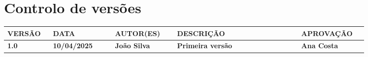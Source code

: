 \setlength{\headheight}{61.22015pt}
\addtolength{\topmargin}{-11.22015pt}

\newpage
\thispagestyle{otherpages}
\vspace*{30pt}
\section*{Controlo de versões}

\small
\begin{tabular}{| >{\centering\arraybackslash}p{0.1\linewidth} | >{\centering\arraybackslash}p{0.15\linewidth} | >{\centering\arraybackslash}p{0.15\linewidth} | >{\centering\arraybackslash}p{0.3\linewidth} | >{\centering\arraybackslash}p{0.15\linewidth} |}
    \hline
    VERSÃO & DATA & AUTOR(ES) & DESCRIÇÃO & APROVAÇÃO \\
    \hline
    \textbf{1.0} & \textbf{10/04/2025} & \textbf{João Silva} & \textbf{Primeira versão} & \textbf{Ana Costa} \\
    \hline
\end{tabular}